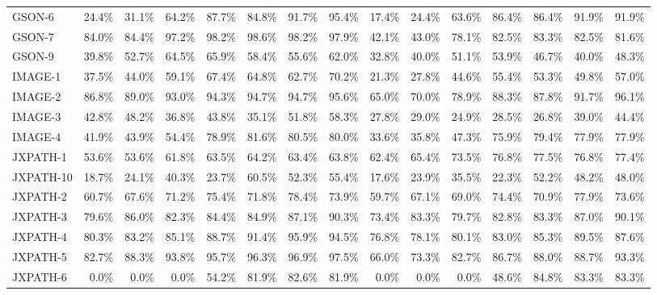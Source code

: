 \begin{tabular}{ l rrrrrrr rrrrrrr}
GSON-6 &  24.4\% &  31.1\% &  64.2\% &  87.7\% &  84.8\% &  91.7\% &  95.4\% &  17.4\% &  24.4\% &  63.6\% &  86.4\% &  86.4\% &  91.9\% &  91.9\%\\ 
GSON-7 &  84.0\% &  84.4\% &  97.2\% &  98.2\% &  98.6\% &  98.2\% &  97.9\% &  42.1\% &  43.0\% &  78.1\% &  82.5\% &  83.3\% &  82.5\% &  81.6\%\\ 
GSON-9 &  39.8\% &  52.7\% &  64.5\% &  65.9\% &  58.4\% &  55.6\% &  62.0\% &  32.8\% &  40.0\% &  51.1\% &  53.9\% &  46.7\% &  40.0\% &  48.3\%\\ 
IMAGE-1 &  37.5\% &  44.0\% &  59.1\% &  67.4\% &  64.8\% &  62.7\% &  70.2\% &  21.3\% &  27.8\% &  44.6\% &  55.4\% &  53.3\% &  49.8\% &  57.0\%\\ 
IMAGE-2 &  86.8\% &  89.0\% &  93.0\% &  94.3\% &  94.7\% &  94.7\% &  95.6\% &  65.0\% &  70.0\% &  78.9\% &  88.3\% &  87.8\% &  91.7\% &  96.1\%\\ 
IMAGE-3 &  42.8\% &  48.2\% &  36.8\% &  43.8\% &  35.1\% &  51.8\% &  58.3\% &  27.8\% &  29.0\% &  24.9\% &  28.5\% &  26.8\% &  39.0\% &  44.4\%\\ 
IMAGE-4 &  41.9\% &  43.9\% &  54.4\% &  78.9\% &  81.6\% &  80.5\% &  80.0\% &  33.6\% &  35.8\% &  47.3\% &  75.9\% &  79.4\% &  77.9\% &  77.9\%\\ 
JXPATH-1 &  53.6\% &  53.6\% &  61.8\% &  63.5\% &  64.2\% &  63.4\% &  63.8\% &  62.4\% &  65.4\% &  73.5\% &  76.8\% &  77.5\% &  76.8\% &  77.4\%\\ 
JXPATH-10 &  18.7\% &  24.1\% &  40.3\% &  23.7\% &  60.5\% &  52.3\% &  55.4\% &  17.6\% &  23.9\% &  35.5\% &  22.3\% &  52.2\% &  48.2\% &  48.0\%\\ 
JXPATH-2 &  60.7\% &  67.6\% &  71.2\% &  75.4\% &  71.8\% &  78.4\% &  73.9\% &  59.7\% &  67.1\% &  69.0\% &  74.4\% &  70.9\% &  77.9\% &  73.6\%\\ 
JXPATH-3 &  79.6\% &  86.0\% &  82.3\% &  84.4\% &  84.9\% &  87.1\% &  90.3\% &  73.4\% &  83.3\% &  79.7\% &  82.8\% &  83.3\% &  87.0\% &  90.1\%\\ 
JXPATH-4 &  80.3\% &  83.2\% &  85.1\% &  88.7\% &  91.4\% &  95.9\% &  94.5\% &  76.8\% &  78.1\% &  80.1\% &  83.0\% &  85.3\% &  89.5\% &  87.6\%\\ 
JXPATH-5 &  82.7\% &  88.3\% &  93.8\% &  95.7\% &  96.3\% &  96.9\% &  97.5\% &  66.0\% &  73.3\% &  82.7\% &  86.7\% &  88.0\% &  88.7\% &  93.3\%\\ 
JXPATH-6 &  0.0\% &  0.0\% &  0.0\% &  54.2\% &  81.9\% &  82.6\% &  81.9\% &  0.0\% &  0.0\% &  0.0\% &  48.6\% &  84.8\% &  83.3\% &  83.3\%\\ 

\end{tabular}
